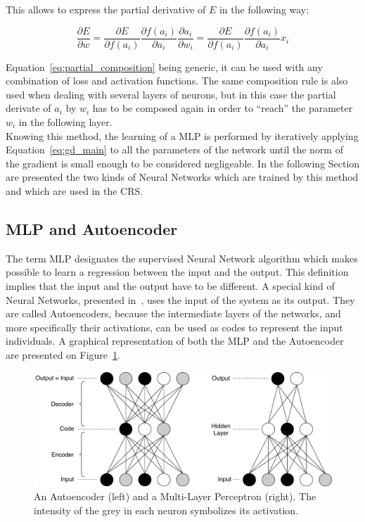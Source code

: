 \documentclass[a4paper]{report}
\begin{document}
    This allows to express the partial derivative of $E$ in the following way:

    \begin{equation}
        \frac{\partial E}{\partial w} = \frac{\partial E}{\partial f\left( a_i\right)} \frac{\partial f(a_i)}{\partial a_i}\frac{\partial a_i}{\partial w_i} = \frac{\partial E}{\partial f\left( a_i\right)} \frac{\partial f(a_i)}{\partial a_i} x_i
        \label{eq:partial_composition}
    \end{equation}

    Equation~\ref{eq:partial_composition} being generic, it can be used with any combination of loss and activation functions. The same composition rule is also used when dealing with several layers of neurons, but in this case the partial derivate of $a_i$ by $w_i$ has to be composed again in order to ``reach'' the parameter $w_i$ in the following layer.\\

    Knowing this method, the learning of a MLP is performed by iteratively applying Equation~\ref{eq:gd_main} to all the parameters of the network until the norm of the gradient is small enough to be considered negligeable. In the following Section are presented the two kinds of Neural Networks which are trained by this method and which are used in the CRS.\@

    \subsection{MLP and Autoencoder}

    The term MLP designates the supervised Neural Network algorithm which makes possible to learn a regression between the input and the output. This definition implies that the input and the output have to be different. A special kind of Neural Networks, presented in~\cite{vincent2008extracting}, uses the input of the system as its output. They are called Autoencoders, because the intermediate layers of the networks, and more specifically their activations, can be used as codes to represent the input individuals. A graphical representation of both the MLP and the Autoencoder are presented on Figure~\ref{fig:mlp_ae}.\\

    \begin{figure}[h]
        \centering
        \includegraphics[scale=.5]{mlp_ae}
        \caption{An Autoencoder (left) and a Multi-Layer Perceptron (right). The intensity of the grey in each neuron symbolizes its activation.}
\label{fig:mlp_ae}
    \end{figure}
    
\end{document}
